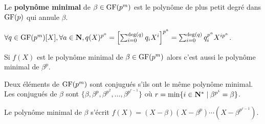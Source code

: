 	\begin{defn}
		Le \textbf{polynôme minimal} de $\beta \in \mathrm{GF}(p^m)$ est le polynôme de plus petit degré dans $\mathrm{GF}(p)$ qui annule $\beta$.
	\end{defn}

	\begin{pop}[de Frobenius]
		$\forall q \in \mathrm{GF}(p^m)[X], \forall a \in \mathbf{N}, q(X)^{p^a} = \left[ \sum_{i = 0}^{\deg(q)} q_i X^i \right]^{p^a} = \sum_{i = 0}^{\deg(q)} q_i^{p^a} X^{ip^a}$.
	\end{pop}

	\begin{thm}
		Si $f(X)$ est le polynôme minimal de $\beta \in \mathrm{GF}(p^m)$ alors c'est aussi le polynôme minimal de $\beta^p$.
	\end{thm}

	Deux éléments de $\mathrm{GF}(p^m)$ sont conjugués s'ils ont le même polynôme minimal.
	Les conjugués de $\beta$ sont $\{ \beta, \beta^p, \beta^{p^2}, \ldots, \beta^{p^{r - 1}} \}$ où $r = \min \{ i \in \mathbf{N}^* \mid \beta^{p^i} = \beta \}$.

	Le polynôme minimal de $\beta$ s'écrit $f(X) = (X - \beta)(X - \beta^p) \cdots (X - \beta^{p^{r - 1}})$.
